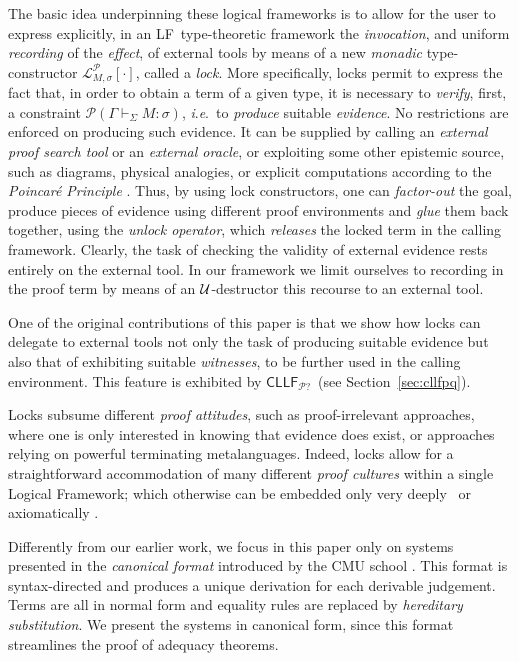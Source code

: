 \documentclass[submission,copyright,creativecommons]{eptcs}
\theoremstyle{plain}
\theoremstyle{definition}
\newcommand{\LF}  {\mbox{$\mathsf {LF}$}}
\newcommand{\CLLFPQ} {\mbox{$\mathsf{CLLF}_{\mathcal P?}$}}
\newcommand {\ie}        {{\textit{i}.\textit{e}.}}
\newcommand {\Lock}   [4] {{\mathcal{L}}^{#1}_{#2, #3}[{#4}]} \newcommand {\LockC} [3] {{\mathcal{L}}^{#1}_{#2}      [{#3}]}
\newcommand {\VDASHS} {\vdash_\Sigma} \newcommand {\VDASHO} {\vdash_\Omega} \newcommand {\VDASHCBV} {\vdash_{\Sigma_{{CBV}}}} \newcommand {\VDASHSIMP} {\vdash_{\Sigma_{{Imp}}}} \newcommand {\VDASHSHOARE} {\vdash_{\Sigma_{{Hoare}}}} \newcommand {\VDASHSERASE} {\vdash_{\Sigma^\Erase}}    \newcommand {\VDASHEAL} {\vdash_{EAL}} \newcommand {\VDASHSEAL} {\vdash_{\Sigma_{{EAL}}}} \newcommand {\VDASHFP} {\vdash_{\sf FPST}}
\renewcommand {\P} {\mathcal{P}} \newcommand {\Q} {\mathcal{Q}}
\renewcommand {\L} {\mathcal{L}} \newcommand   {\C} {\mathcal{C}} \newcommand   {\T} {\mathcal{T}} \newcommand   {\U} {\mathcal{U}}
\newcommand{\Erase} {{-\U\L}}
\def \LF	{\mbox {{\sf LF}}}
\begin{document}
The basic idea underpinning these logical frameworks is to allow for
the user to express explicitly, in an \LF\ type-theoretic framework
the \emph{invocation}, and uniform \emph{recording} of the
\emph{effect}, of external tools by means of a new \emph{monadic}
type-constructor $\Lock{\P}{M}{\sigma}{\cdot}$, called a \emph{lock}.
More specifically, locks permit to express the fact that, in order to
obtain a term of a given type, it is necessary to \emph{verify},
first, a constraint ${\P}(\Gamma \VDASHS M : \sigma)$, \ie\ to
\emph{produce} suitable \emph{evidence}. No restrictions are enforced
on producing such evidence. It can be supplied by calling an
\emph{external proof search tool} or an \emph{external oracle}, or
exploiting some other epistemic source, such as diagrams, physical
analogies, or explicit computations according to the \emph{Poincar\'e
  Principle} \cite{bar02}. Thus, by using lock constructors, one can
\emph{factor-out} the goal, produce pieces of evidence using different
proof environments and \emph{glue} them back together, using the
\emph{unlock operator}, which \emph{releases} the locked term in the
calling framework. Clearly, the task of checking the validity of
external evidence rests entirely on the external tool. In our
framework we limit ourselves to recording in the proof term by means
of an $\cal U$-destructor this recourse to an external tool.

One of the original contributions of this paper is that we show how
locks can delegate to external tools not only the task of producing
suitable evidence but also that of exhibiting suitable
\emph{witnesses}, to be further used in the calling environment. This
feature is exhibited by \CLLFPQ\ (see Section~\ref{sec:cllfpq}).

Locks subsume different \emph{proof attitudes}, such as
proof-irrelevant approaches, where one is only interested in knowing
that evidence does exist, or approaches relying on powerful
terminating metalanguages. Indeed, locks allow for a straightforward
accommodation of many different \emph{proof cultures} within a single
Logical Framework; which otherwise can be embedded only very
deeply~\cite{deep,hirschkoff:bisimproofs} or axiomatically
\cite{HMS-01}.

Differently from our earlier work, we focus in this paper only on
systems presented in the \emph{canonical format} introduced by the CMU
school \cite{watkins-02,HarperLicata-jfp-07}. This format is
syntax-directed and produces a unique derivation for each derivable
judgement. Terms are all in normal form and equality rules are
replaced by \emph{hereditary substitution}. We present the systems in
canonical form, since this format streamlines the proof of adequacy
theorems.
\end{document}
